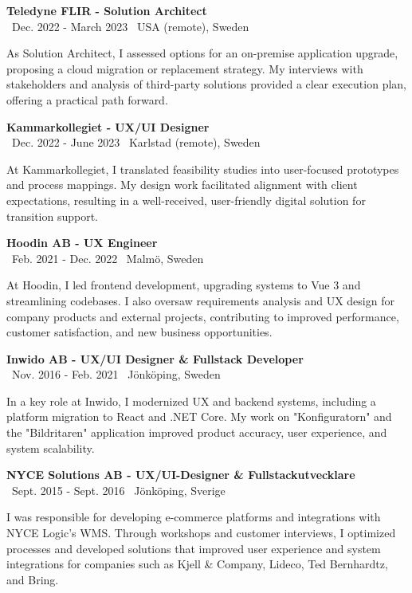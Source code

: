 \documentclass[a4paper,10pt]{article}
\begin{document}
\vspace{0.5cm}
\textbf{Teledyne FLIR - Solution Architect}\\
\normalsize \faCalendar \ Dec. 2022 - March 2023 \quad \faMapMarker \ USA (remote), Sweden

As Solution Architect, I assessed options for an on-premise application upgrade, proposing a cloud migration or replacement strategy. My interviews with stakeholders and analysis of third-party solutions provided a clear execution plan, offering a practical path forward.

\vspace{0.5cm}
\textbf{Kammarkollegiet - UX/UI Designer}\\
\normalsize \faCalendar \ Dec. 2022 - June 2023 \quad \faMapMarker \ Karlstad (remote), Sweden

At Kammarkollegiet, I translated feasibility studies into user-focused prototypes and process mappings. My design work facilitated alignment with client expectations, resulting in a well-received, user-friendly digital solution for transition support.

\vspace{0.5cm}
\textbf{Hoodin AB - UX Engineer}\\
\normalsize \faCalendar \ Feb. 2021 - Dec. 2022 \quad \faMapMarker \ Malmö, Sweden

At Hoodin, I led frontend development, upgrading systems to Vue 3 and streamlining codebases. I also oversaw requirements analysis and UX design for company products and external projects, contributing to improved performance, customer satisfaction, and new business opportunities.

\vspace{0.5cm}
\textbf{Inwido AB - UX/UI Designer \& Fullstack Developer}\\
\normalsize \faCalendar \ Nov. 2016 - Feb. 2021 \quad \faMapMarker \ Jönköping, Sweden

In a key role at Inwido, I modernized UX and backend systems, including a platform migration to React and .NET Core. My work on "Konfiguratorn" and the "Bildritaren" application improved product accuracy, user experience, and system scalability.

\vspace{0.5cm}
\textbf{NYCE Solutions AB - UX/UI-Designer \& Fullstackutvecklare}\\
\normalsize \faCalendar \ Sept. 2015 - Sept. 2016 \quad \faMapMarker \ Jönköping, Sverige

I was responsible for developing e-commerce platforms and integrations with NYCE Logic’s WMS. Through workshops and customer interviews, I optimized processes and developed solutions that improved user experience and system integrations for companies such as Kjell \& Company, Lideco, Ted Bernhardtz, and Bring.
\end{document}
